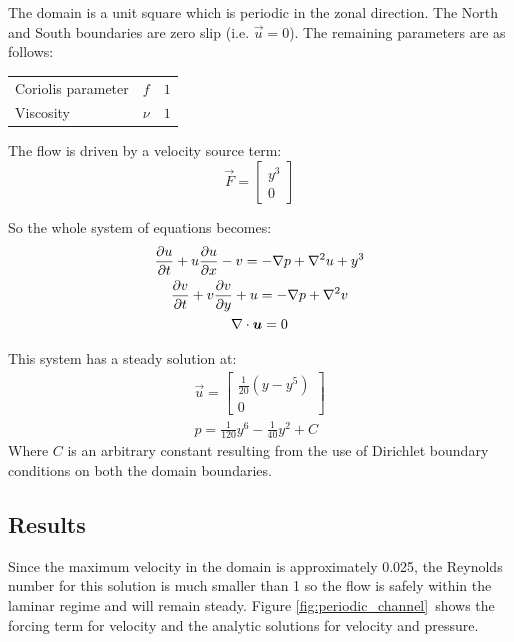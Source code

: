 The domain is a unit square which is periodic in the zonal direction. The
North and South boundaries are zero slip (i.e. $\vec{u}=0$). The remaining
parameters are as follows:

\begin{tabular}{lll}
  Coriolis parameter & $f$ & $1$ \\
  Viscosity & $\nu$ & $1$ 
\end{tabular}

The flow is driven by a velocity source term:
\begin{equation}
  \vec{F}=
  \begin{bmatrix}
    y^3 \\
    0
  \end{bmatrix}
\end{equation}

So the whole system of equations becomes:
\begin{gather}
  \ppt{u}+u\ppt[x]{u}-v=-\grad p + \grad^2 u +y^3\\
  \ppt{v}+v\ppt[y]{v}+u=-\grad p + \grad^2 v\\
  \div\vec{u}=0
\end{gather}

This system has a steady solution at:
\begin{gather}
  \vec{u}=
  \begin{bmatrix}
    \frac{1}{20}(y-y^5)\\
    0
  \end{bmatrix}\\
  p=\frac{1}{120}y^6-\frac{1}{40}y^2+C
\end{gather}
Where $C$ is an arbitrary constant resulting from the use of Dirichlet
boundary conditions on both the domain boundaries.

\subsection{Results}

Since the maximum velocity in the domain is approximately 0.025, the
Reynolds number for this solution is much smaller than 1 so the flow is
safely within the laminar regime and will remain steady. Figure
\ref{fig:periodic_channel}\ shows the forcing term for velocity and the
analytic solutions for velocity and pressure.


